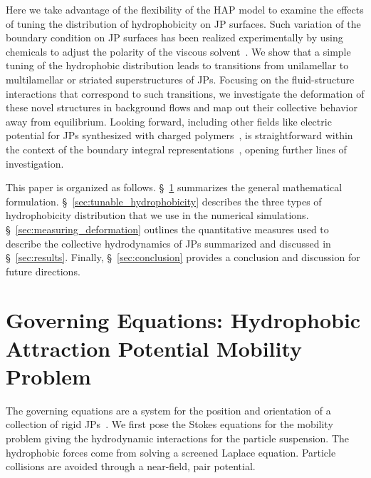 \documentclass[prb,preprint,showpacs,preprintnumbers,amsmath,amssymb,longbibliography]{revtex4-2}
\begin{document}
Here we take advantage of the flexibility of the HAP model to examine
the effects of tuning the distribution of hydrophobicity on JP surfaces.
Such variation of the boundary condition on JP surfaces has been
realized experimentally by using chemicals to adjust the polarity of the
viscous solvent~\cite{Zarzaretal2015, KirillovaMarschelkeSynytska2019,
doi:10.1021/la503455h}. We show that a simple tuning of the hydrophobic
distribution leads to transitions from unilamellar to multilamellar or
striated superstructures of JPs. Focusing on the fluid-structure
interactions that correspond to such transitions, we investigate the
deformation of these novel structures in background flows and map out
their collective behavior away from equilibrium. Looking forward,
including other fields like electric potential for JPs synthesized with
charged polymers~\cite{HongCacciutoLuijtenGranick2008,
doi:10.1021/la503455h, KangHonciuc2018}, is straightforward within the
context of the boundary integral
representations~\cite{kohl-cor-che-vee22}, opening further lines of
investigation.

This paper is organized as follows. \S~\ref{sec:governing_equations}
summarizes the general mathematical formulation.
\S~\ref{sec:tunable_hydrophobicity} describes the three types of
hydrophobicity distribution that we use in the numerical simulations.
\S~\ref{sec:measuring_deformation} outlines the quantitative measures
used to describe the collective hydrodynamics of JPs summarized and
discussed in \S~\ref{sec:results}. Finally, \S~\ref{sec:conclusion}
provides a conclusion and discussion for future directions.

\section{Governing Equations: Hydrophobic Attraction Potential Mobility Problem} 
\label{sec:governing_equations}
The governing equations are a system for the position and orientation of
a collection of rigid JPs~\cite{Fu2022_JFM}. We first pose the Stokes
equations for the mobility problem giving the hydrodynamic interactions
for the particle suspension. The hydrophobic forces come from solving a
screened Laplace equation. Particle collisions are avoided through a
near-field, pair potential.

\end{document}
